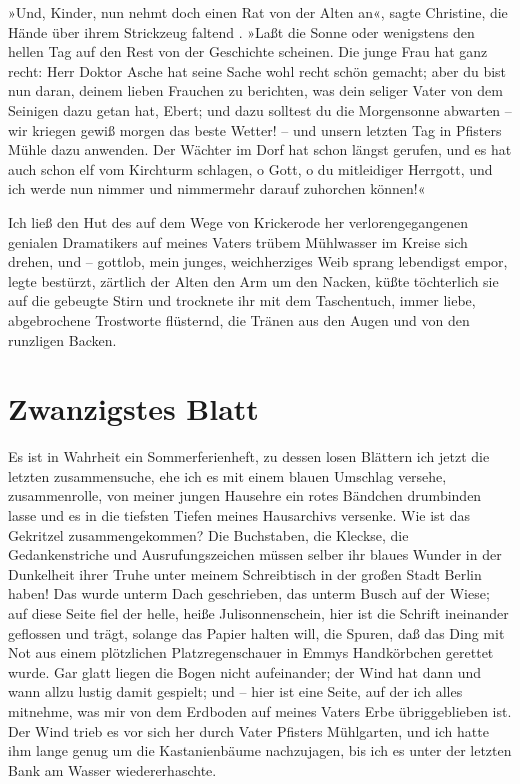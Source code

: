 »Und, Kinder, nun nehmt doch einen Rat von der Alten an«, sagte
Christine, die Hände über ihrem Strickzeug faltend . »Laßt die
Sonne oder wenigstens den hellen Tag auf den Rest von der
Geschichte scheinen. Die junge Frau hat ganz recht: Herr Doktor
Asche hat seine Sache wohl recht schön gemacht; aber du bist nun
daran, deinem lieben Frauchen zu berichten, was dein seliger Vater
von dem Seinigen dazu getan hat, Ebert; und dazu solltest du die
Morgensonne abwarten – wir kriegen gewiß morgen das beste Wetter! –
und unsern letzten Tag in Pfisters Mühle dazu anwenden. Der Wächter
im Dorf hat schon längst gerufen, und es hat auch schon elf vom
Kirchturm schlagen, o Gott, o du mitleidiger Herrgott, und ich
werde nun nimmer und nimmermehr darauf zuhorchen können!«

Ich ließ den Hut des auf dem Wege von Krickerode her
verlorengegangenen genialen Dramatikers auf meines Vaters trübem
Mühlwasser im Kreise sich drehen, und – gottlob, mein junges,
weichherziges Weib sprang lebendigst empor, legte bestürzt,
zärtlich der Alten den Arm um den Nacken, küßte töchterlich sie auf
die gebeugte Stirn und trocknete ihr mit dem Taschentuch, immer
liebe, abgebrochene Trostworte flüsternd, die Tränen aus den Augen
und von den runzligen Backen.

\section{Zwanzigstes Blatt}

Es ist in Wahrheit ein Sommerferienheft, zu dessen losen Blättern
ich jetzt die letzten zusammensuche, ehe ich es mit einem blauen
Umschlag versehe, zusammenrolle, von meiner jungen Hausehre ein
rotes Bändchen drumbinden lasse und es in die tiefsten Tiefen
meines Hausarchivs versenke. Wie ist das Gekritzel
zusammengekommen? Die Buchstaben, die Kleckse, die Gedankenstriche
und Ausrufungszeichen müssen selber ihr blaues Wunder in der
Dunkelheit ihrer Truhe unter meinem Schreibtisch in der großen
Stadt Berlin haben! Das wurde unterm Dach geschrieben, das unterm
Busch auf der Wiese; auf diese Seite fiel der helle, heiße
Julisonnenschein, hier ist die Schrift ineinander geflossen und
trägt, solange das Papier halten will, die Spuren, daß das Ding mit
Not aus einem plötzlichen Platzregenschauer in Emmys Handkörbchen
gerettet wurde. Gar glatt liegen die Bogen nicht aufeinander; der
Wind hat dann und wann allzu lustig damit gespielt; und – hier ist
eine Seite, auf der ich alles mitnehme, was mir von dem Erdboden
auf meines Vaters Erbe übriggeblieben ist. Der Wind trieb es vor
sich her durch Vater Pfisters Mühlgarten, und ich hatte ihm lange
genug um die Kastanienbäume nachzujagen, bis ich es unter der
letzten Bank am Wasser wiedererhaschte.

